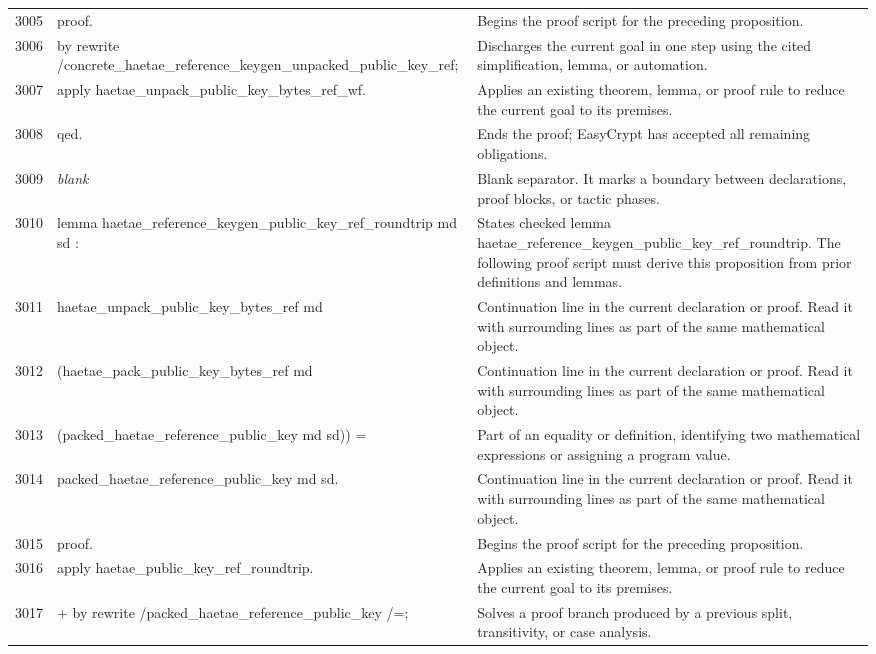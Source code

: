 \documentclass[10pt]{article}
\begin{document}
\begin{longtable}{r L{0.53\textwidth} L{0.37\textwidth}}
3005 & {\ttfamily\scriptsize proof.} & Begins the proof script for the preceding proposition. \\
3006 & {\ttfamily\scriptsize by rewrite /concrete\_haetae\_reference\_keygen\_unpacked\_public\_key\_ref;} & Discharges the current goal in one step using the cited simplification, lemma, or automation. \\
3007 & {\ttfamily\scriptsize    apply haetae\_unpack\_public\_key\_bytes\_ref\_wf.} & Applies an existing theorem, lemma, or proof rule to reduce the current goal to its premises. \\
3008 & {\ttfamily\scriptsize qed.} & Ends the proof; EasyCrypt has accepted all remaining obligations. \\
3009 & {\ttfamily\scriptsize \emph{blank}} & Blank separator.  It marks a boundary between declarations, proof blocks, or tactic phases. \\
3010 & {\ttfamily\scriptsize lemma haetae\_reference\_keygen\_public\_key\_ref\_roundtrip md sd :} & States checked lemma haetae\_reference\_keygen\_public\_key\_ref\_roundtrip.  The following proof script must derive this proposition from prior definitions and lemmas. \\
3011 & {\ttfamily\scriptsize   haetae\_unpack\_public\_key\_bytes\_ref md} & Continuation line in the current declaration or proof.  Read it with surrounding lines as part of the same mathematical object. \\
3012 & {\ttfamily\scriptsize     (haetae\_pack\_public\_key\_bytes\_ref md} & Continuation line in the current declaration or proof.  Read it with surrounding lines as part of the same mathematical object. \\
3013 & {\ttfamily\scriptsize       (packed\_haetae\_reference\_public\_key md sd)) =} & Part of an equality or definition, identifying two mathematical expressions or assigning a program value. \\
3014 & {\ttfamily\scriptsize   packed\_haetae\_reference\_public\_key md sd.} & Continuation line in the current declaration or proof.  Read it with surrounding lines as part of the same mathematical object. \\
3015 & {\ttfamily\scriptsize proof.} & Begins the proof script for the preceding proposition. \\
3016 & {\ttfamily\scriptsize apply haetae\_public\_key\_ref\_roundtrip.} & Applies an existing theorem, lemma, or proof rule to reduce the current goal to its premises. \\
3017 & {\ttfamily\scriptsize + by rewrite /packed\_haetae\_reference\_public\_key /=;} & Solves a proof branch produced by a previous split, transitivity, or case analysis. \\

\end{longtable}
\end{document}
